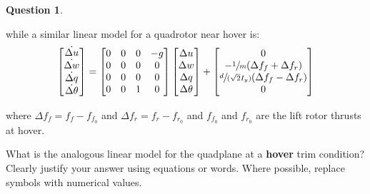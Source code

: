 \documentclass{article}
\theoremstyle{definition}
\newtheorem{question}{Question}
\begin{document}
\begin{question}
\begin{enumerate}[label=\alph*)]
        while a similar linear model for a quadrotor near hover is:
        \begin{equation}
            \begin{bmatrix} \dot{\Delta u} \\ \dot{\Delta w} \\ \dot{\Delta q} \\ \dot{\Delta \theta} \end{bmatrix}
            = \begin{bmatrix} 
                0 & 0 & 0 & -g \\
                0 & 0 & 0 & 0  \\
                0 & 0 & 0 & 0  \\
                0 & 0 & 1 & 0  \\
            \end{bmatrix}
            \begin{bmatrix} \Delta u \\ \Delta w \\ \Delta q \\ \Delta \theta \end{bmatrix}
            + \begin{bmatrix}
                0 \\
                -\sfrac{1}{m} (\Delta f_f + \Delta f_r) \\
                \sfrac{d}{(\sqrt{2} I_y)} (\Delta f_f - \Delta f_r) \\
                0 \\
            \end{bmatrix}
        \end{equation}

        where $\Delta f_f = f_f - f_{f_0}$ and $\Delta f_r = f_r - f_{r_0}$ and $f_{f_0}$ and $f_{r_0}$ are the lift rotor thrusts at hover.

        What is the analogous linear model for the quadplane at a \textbf{hover} trim condition? Clearly justify your answer using equations or words. Where possible, replace symbols with numerical values.
\end{enumerate}

\end{question}

\clearpage
\end{document}
